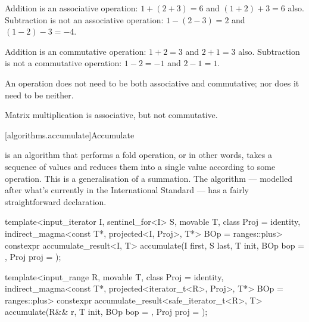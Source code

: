 \pnum
\begin{example}
   Addition is an associative operation: $1 + (2 + 3) = 6$ and $(1 + 2) + 3 = 6$ also. Subtraction
   is not an associative operation: $1 - (2 - 3) = 2$ and $(1 - 2) - 3 = -4$.
\end{example}

\pnum
\begin{example}
   Addition is an commutative operation: $1 + 2 = 3$ and $2 + 1 = 3$ also. Subtraction is not a
   commutative operation: $1 - 2 = -1$ and $2 - 1 = 1$.
\end{example}

\pnum
\begin{note}
   An operation does not need to be both associative and commutative; nor does it need to be
   neither.
   \begin{example}
      Matrix multiplication is associative, but not commutative\cite{wolfram-matrix-multiplication}.
   \end{example}
\end{note}

[algorithms.accumulate]{Accumulate}

 is an algorithm that performs a fold operation, or in other words, takes a
sequence of values and reduces them into a single value according to some operation. This is a
generalisation of a summation.  The algorithm --- modelled after what's currently in the
International Standard --- has a fairly straightforward declaration.

\begin{itemdecl}
template<input_iterator I, sentinel_for<I> S, movable T, class Proj = identity,
         indirect_magma<const T*, projected<I, Proj>, T*> BOp = ranges::plus>
constexpr accumulate_result<I, T>
  accumulate(I first, S last, T init, BOp bop = {}, Proj proj = {});

template<input_range R, movable T, class Proj = identity,
         indirect_magma<const T*, projected<iterator_t<R>, Proj>, T*> BOp = ranges::plus>
constexpr accumulate_result<safe_iterator_t<R>, T>
  accumulate(R&& r, T init, BOp bop = {}, Proj proj = {});
\end{itemdecl}


